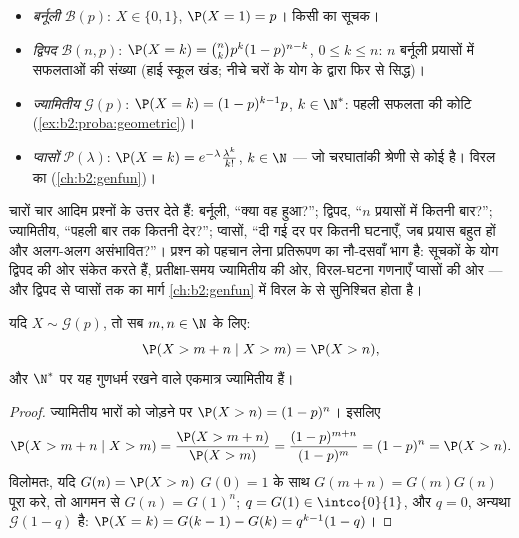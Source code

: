 \begin{example}[शास्त्रीय नियम]\label{ex:b2:randomvar:laws}
\leavevmode
\begin{itemize}
\item \emph{बर्नूली} $\mathcal{B}(p)$: $X \in \{0, 1\}$, $\P(X =
1) = p$। किसी  का सूचक।
\item \emph{द्विपद} $\mathcal{B}(n, p)$: $\P(X = k) =
\binom nk p^k(1-p)^{n-k}$, $0 \leq k \leq n$: $n$  बर्नूली प्रयासों
में सफलताओं की संख्या (हाई स्कूल खंड; नीचे  चरों के योग के
द्वारा फिर से सिद्ध)।
\item \emph{ज्यामितीय} $\mathcal{G}(p)$: $\P(X = k) =
(1-p)^{k-1}p$, $k \in \N^*$: पहली सफलता की कोटि (\cref{ex:b2:proba:geometric})।
\item \emph{प्वासों} $\mathcal{P}(\lambda)$: $\P(X = k) =
e^{-\lambda}\frac{\lambda^k}{k!}$, $k \in \N$ --- जो चरघातांकी श्रेणी से
कोई  है। विरल  का  (\cref{ch:b2:genfun})।
\end{itemize}
\end{example}

\begin{remark}[कौन सा नियम किसका प्रतिरूप है]
चारों  चार आदिम प्रश्नों के उत्तर देते हैं: बर्नूली, ``क्या वह
हुआ?''; द्विपद, ``$n$ प्रयासों में कितनी बार?''; ज्यामितीय, ``पहली
बार तक कितनी देर?''; प्वासों, ``दी गई दर पर कितनी घटनाएँ, जब
प्रयास बहुत हों और अलग-अलग असंभावित?''। प्रश्न को पहचान लेना
प्रतिरूपण का नौ-दसवाँ भाग है: सूचकों के योग द्विपद की ओर संकेत करते
हैं, प्रतीक्षा-समय ज्यामितीय की ओर, विरल-घटना गणनाएँ प्वासों की ओर
--- और द्विपद से प्वासों तक का मार्ग \cref{ch:b2:genfun} में विरल  के  से
सुनिश्चित होता है।
\end{remark}

\begin{proposition}[ज्यामितीय नियम की
स्मृतिहीनता]\label{prop:b2:randomvar:memoryless}
यदि $X \sim \mathcal{G}(p)$, तो सब $m, n \in \N$ के लिए:
\[
\P(X > m + n \mid X > m) = \P(X > n) ,
\]
और $\N^*$ पर यह गुणधर्म रखने वाले एकमात्र  ज्यामितीय  हैं।
\end{proposition}

\begin{proof}
ज्यामितीय भारों को जोड़ने पर $\P(X > n) = (1-p)^n$। इसलिए
\[
\P(X > m + n \mid X > m)
= \frac{\P(X > m + n)}{\P(X > m)}
= \frac{(1-p)^{m+n}}{(1-p)^m} = (1-p)^n = \P(X > n).
\]
विलोमतः, यदि $G(n) = \P(X > n)$ $G(0) = 1$ के साथ $G(m + n) =
G(m)G(n)$ पूरा करे, तो आगमन से $G(n) = G(1)^n$; $q =
G(1) \in \intco{0}{1}$,
और $q = 0$, अन्यथा  $\mathcal{G}(1 - q)$ है: $\P(X = k) = G(k-1) - G(k) =
q^{k-1}(1 - q)$।
\end{proof}

